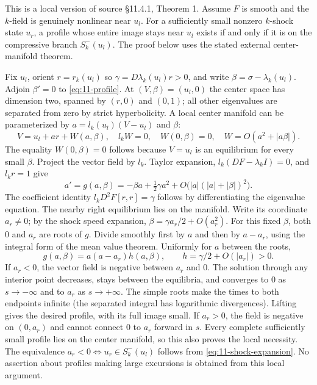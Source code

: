 \begin{theorem}
This is a local version of source \S11.4.1, Theorem 1.
Assume $F$ is smooth and the $k$-field is genuinely nonlinear near
$u_l$. For a sufficiently small nonzero $k$-shock state $u_r$, a
profile whose entire image stays near $u_l$ exists if and only if
it is on the compressive branch $S_k^-(u_l)$. The proof below uses
the stated external center-manifold theorem.
\end{theorem}
\begin{expandedproof}
Fix $u_l$, orient $r=r_k(u_l)$ so $\gamma=D\lambda_k(u_l)r>0$,
and write $\beta=\sigma-\lambda_k(u_l)$. Adjoin $\beta'=0$ to
\eqref{eq:11-profile}. At $(V,\beta)=(u_l,0)$ the center space has
dimension two, spanned by $(r,0)$ and $(0,1)$; all other eigenvalues
are separated from zero by strict hyperbolicity. A local center
manifold can be parameterized by $a=l_k(u_l)(V-u_l)$ and $\beta$:
\[
 V=u_l+ar+W(a,\beta),\quad l_kW=0,\quad
 W(0,\beta)=0,\quad W=O(a^2+|a\beta|).
\]
The equality $W(0,\beta)=0$ follows because $V=u_l$ is an equilibrium
for every small $\beta$. Project the vector field by $l_k$.
Taylor expansion, $l_k(DF-\lambda_kI)=0$, and $l_kr=1$ give
\[
 a'=g(a,\beta)=-\beta a+\tfrac12\gamma a^2
       +O\bigl(|a|(|a|+|\beta|)^2\bigr).
\]
The coefficient identity $l_kD^2F[r,r]=\gamma$ follows by
differentiating the eigenvalue equation. The nearby right equilibrium
lies on the manifold. Write its coordinate $a_r\ne0$; by the shock
speed expansion, $\beta=\gamma a_r/2+O(a_r^2)$.
For this fixed $\beta$, both $0$ and $a_r$ are roots of $g$.
Divide smoothly first by $a$ and then by $a-a_r$, using the integral
form of the mean value theorem. Uniformly for $a$ between the roots,
\[
 g(a,\beta)=a(a-a_r)h(a,\beta),\qquad
 h=\gamma/2+O(|a_r|)>0.
\]
If $a_r<0$, the vector field is negative between $a_r$ and $0$.
The solution through any interior point decreases, stays between
the equilibria, and converges to $0$ as $s\to-\infty$ and to $a_r$
as $s\to+\infty$. The simple roots make the times to both endpoints
infinite (the separated integral has logarithmic divergences).
Lifting gives the desired profile, with its full image small.
If $a_r>0$, the field is negative on $(0,a_r)$ and cannot connect
$0$ to $a_r$ forward in $s$. Every complete sufficiently small
profile lies on the center manifold, so this also proves the local
necessity. The equivalence $a_r<0\iff u_r\in S_k^-(u_l)$ follows
from \eqref{eq:11-shock-expansion}. No assertion about profiles
making large excursions is obtained from this local argument.
\end{expandedproof}

